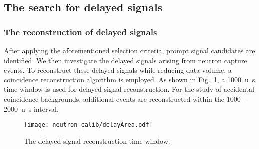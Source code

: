 \subsection{The search for delayed signals}
\subsubsection{The reconstruction of delayed signals}
\label{sec:coincidentRecon}
After applying the aforementioned selection criteria, prompt signal candidates are identified.
We then investigate the delayed signals arising from neutron capture events.
To reconstruct these delayed signals while reducing data volume, a coincidence reconstruction algorithm is employed.
As shown in Fig.~\ref{fig:delayedCoincidence}, a \SI{1000}{u\second} time window is used for delayed signal reconstruction.
For the study of accidental coincidence backgrounds, additional events are reconstructed within the 1000--\SI{2000}{u\second} interval.
\begin{figure}[h]
	\centering
	{\texttt{[image: neutron\_calib/delayArea.pdf]}}
	\caption{The delayed signal reconstruction time window.}
	\label{fig:delayedCoincidence}
\end{figure}
